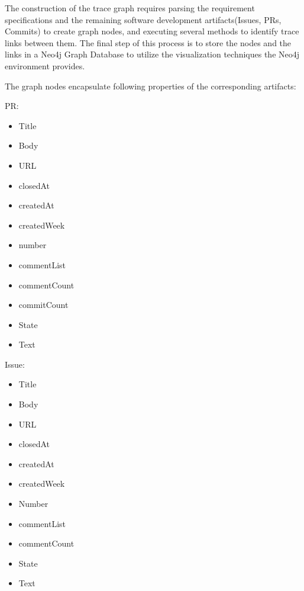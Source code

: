 The construction of the trace graph requires parsing the requirement specifications and the remaining software development artifacts(Issues, PRs, Commits) to create graph nodes, and executing several methods to identify trace links between them. The final step of this process is to store the nodes and the links in a Neo4j Graph Database to utilize the visualization techniques the Neo4j environment provides.

The graph nodes encapsulate following properties of the corresponding artifacts:

\begin{multicols}{2}

PR:
\begin{itemize}
\item Title
\item Body
\item URL
\item closedAt
\item createdAt
\item createdWeek
\item number
\item commentList
\item commentCount
\item commitCount
\item State
\item Text
\end{itemize}

\columnbreak

Issue:
\begin{itemize}
\item Title
\item Body
\item URL
\item closedAt
\item createdAt
\item createdWeek
\item Number
\item commentList
\item commentCount
\item State
\item Text\\
\end{itemize}

\end{multicols}

